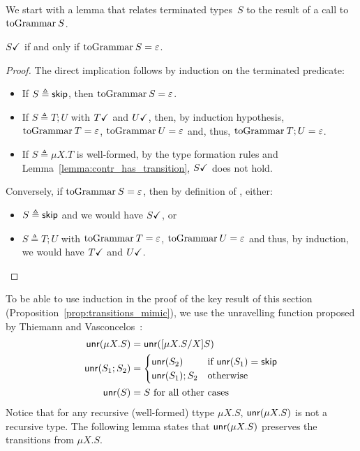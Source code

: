 We start with a lemma that relates terminated types~$S$ to the result 
of a call to $\toGrammarf S$.

\begin{lemma}
	\label{lemma:terminated-togrammar}
	 $S\checkmark$ if and only if $\toGrammarf S = \varepsilon$.
\end{lemma}

\begin{proof}
	The direct implication follows by induction on the terminated predicate:
	\begin{itemize}
		\item If $S \triangleq \mathsf{skip}$, then $\toGrammarf{S} = \varepsilon$.
		\item If $S\triangleq T;U$ with $T\checkmark$ and $U\checkmark$, then,
		by induction hypothesis, $\toGrammarf{T} = \varepsilon$,
		$\toGrammarf{U} = \varepsilon$ and, thus, $\toGrammarf{T;U} = \varepsilon$.
		\item If $S\triangleq \mu X.T$ is well-formed, 
		by the type formation rules and 
		Lemma~\ref{lemma:contr_has_transition}, $S\checkmark$
		does not hold.
	\end{itemize}	
	Conversely, if $\toGrammarf{S} = \varepsilon$, then 
	by definition of \toGrammark, either:
	\begin{itemize}
		\item $S\triangleq \mathsf{skip}$ and we would have $S\checkmark$, or
		\item $S\triangleq T;U$ with $\toGrammarf{T} = \varepsilon$,
		$\toGrammarf{U} = \varepsilon$ and thus, by induction, we would have
		$T\checkmark$ and $U\checkmark$.
	\end{itemize}
\end{proof}

To be able to use induction in the proof of 
the key result of this section
(Proposition~\ref{prop:transitions_mimic}), we use
the unravelling function proposed 
by Thiemann and Vasconcelos~\cite{thiemann2016context}:
\[\begin{aligned}
\mathsf{unr}(\mu X . S) &= \mathsf{unr}([{\mu X.S}/{X}] S)\\
\mathsf{unr}(S_1;S_2) &= 
\begin{cases}
	\mathsf{unr}(S_2) & \text{if }\mathsf{unr}(S_1)=\mathsf{skip}\\
	\mathsf{unr}(S_1);S_2 & \text{otherwise}\\
\end{cases} \\
\mathsf{unr}(S)&= S \text{  for all other cases}
\end{aligned}\]
%
Notice that for any recursive (well-formed) ttype 
$\mu X.S$, $\mathsf{unr}(\mu X.S)$ is not a recursive type.
The following lemma states that $\mathsf{unr}(\mu X.S)$ preserves 
the transitions from $\mu X.S$.

